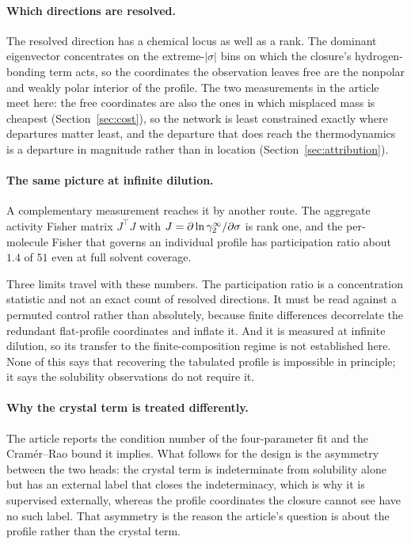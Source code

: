 \paragraph{Which directions are resolved.}
The resolved direction has a chemical locus as well as a rank. The dominant eigenvector
concentrates on the extreme-$|\sigma|$ bins on which the closure's hydrogen-bonding term acts, so
the coordinates the observation leaves free are the nonpolar and weakly polar interior of the
profile. The two measurements in the article meet here: the free coordinates are also the ones in
which misplaced mass is cheapest (Section~\ref{sec:cost}), so the network is least constrained
exactly where departures matter least, and the departure that does reach the thermodynamics is a
departure in magnitude rather than in location (Section~\ref{sec:attribution}).

\paragraph{The same picture at infinite dilution.}
A complementary measurement reaches it by another route. The aggregate activity Fisher matrix
$J^{\top}J$ with $J=\partial\ln\gamma_2^\infty/\partial\sigma$ is rank one, and the per-molecule Fisher that
governs an individual profile has participation ratio about $1.4$ of $51$ even at full solvent
coverage.

Three limits travel with these numbers. The participation ratio is a concentration statistic and
not an exact count of resolved directions. It must be read against a permuted control rather than
absolutely, because finite differences decorrelate the redundant flat-profile coordinates and
inflate it. And it is measured at infinite dilution, so its transfer to the finite-composition
regime is not established here. None of this says that recovering the tabulated profile is
impossible in principle; it says the solubility observations do not require it.

\paragraph{Why the crystal term is treated differently.}
The article reports the condition number of the four-parameter fit and the Cram\'er--Rao bound it
implies. What follows for the design is the asymmetry between the two heads: the crystal term is
indeterminate from solubility alone but has an external label that closes the indeterminacy, which
is why it is supervised externally, whereas the profile coordinates the closure cannot see have no
such label. That asymmetry is the reason the article's question is about the profile rather than
the crystal term.


